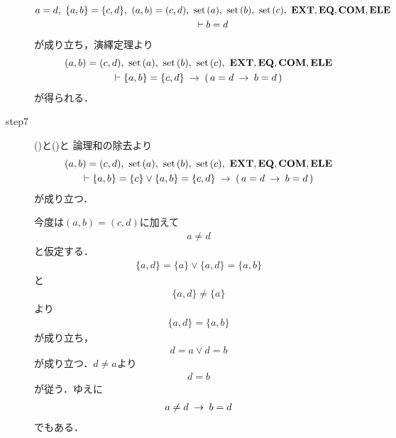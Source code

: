 \begin{sketch}
\begin{description}
				\begin{align}
					\begin{gathered}
						a = d,\ \{a,b\} = \{c,d\},\ (a,b) = (c,d),\ \set{a},\ \set{b},\ \set{c},\ \EXTAX,\EQAX,\COMAX,\ELEAX \\
						\vdash b = d
					\end{gathered}
				\end{align}
				が成り立ち，演繹定理より
				\begin{align}
					\begin{gathered}
						(a,b) = (c,d),\ \set{a},\ \set{b},\ \set{c},\ \EXTAX,\EQAX,\COMAX,\ELEAX \\
						\vdash \{a,b\} = \{c,d\} \rarrow (\, a = d \rarrow b = d\, )
					\end{gathered}
					\label{fom:equality_of_ordered_pairs_12}
				\end{align}
				が得られる．
				
			\item[step7] ()と()と
				論理和の除去より
				\begin{align}
					\begin{gathered}
						(a,b) = (c,d),\ \set{a},\ \set{b},\ \set{c},\ \EXTAX,\EQAX,\COMAX,\ELEAX \\
						\vdash \{a,b\} = \{c\} \vee \{a,b\} = \{c,d\} \rarrow (\, a = d \rarrow b = d\, )
					\end{gathered}
				\end{align}
				が成り立つ．
		
		今度は$(a,b) = (c,d)$に加えて
		\begin{align}
			a \neq d
		\end{align}
		と仮定する．
		\begin{align}
			\{a,d\} = \{a\} \vee \{a,d\} = \{a,b\}
		\end{align}
		と
		\begin{align}
			\{a,d\} \neq \{a\}
		\end{align}
		より
		\begin{align}
			\{a,d\} = \{a,b\}
		\end{align}
		が成り立ち，
		\begin{align}
			d = a \vee d = b
		\end{align}
		が成り立つ．$d \neq a$より
		\begin{align}
			d = b
		\end{align}
		が従う．ゆえに
		\begin{align}
			a \neq d \hspace{0.25em}\rightarrow\hspace{0.25em} b = d
		\end{align}
		でもある．
		\QED
		\end{description}
	\end{sketch}